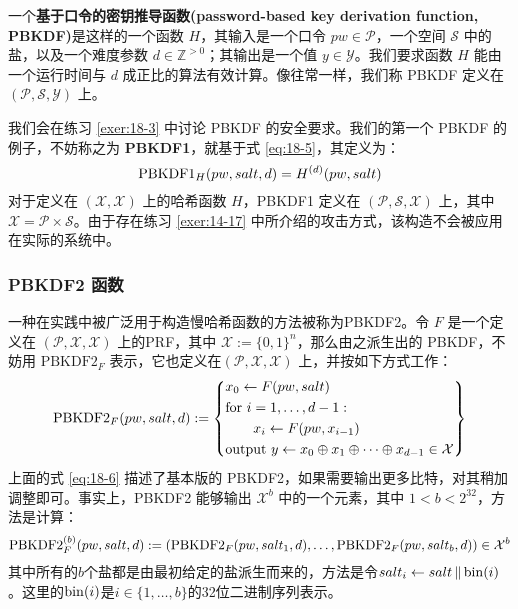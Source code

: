 \begin{definition}
	一个\textbf{基于口令的密钥推导函数(password-based key derivation function, PBKDF)}是这样的一个函数 $H$，其输入是一个口令 $pw\in\mathcal{P}$，一个空间 $\mathcal{S}$ 中的盐，以及一个难度参数 $d\in\mathbb{Z}^{>0}$；其输出是一个值 $y\in\mathcal{Y}$。我们要求函数 $H$ 能由一个运行时间与 $d$ 成正比的算法有效计算。像往常一样，我们称 PBKDF 定义在 $(\mathcal{P},\mathcal{S},\mathcal{Y})$ 上。
\end{definition}

我们会在练习 \ref{exer:18-3} 中讨论 PBKDF 的安全要求。我们的第一个 PBKDF 的例子，不妨称之为 \textbf{PBKDF1}，就基于式 \ref{eq:18-5}，其定义为：
\[
{\rm PBKDF1}_H(pw,salt,d)=H^{(d)}(pw,salt)
\]
对于定义在 $(\mathcal{X},\mathcal{X})$ 上的哈希函数 $H$，PBKDF1 定义在 $(\mathcal{P},\mathcal{S},\mathcal{X})$ 上，其中 $\mathcal{X}=\mathcal{P}\times\mathcal{S}$。由于存在练习 \ref{exer:14-17} 中所介绍的攻击方式，该构造不会被应用在实际的系统中。

\subsubsection{PBKDF2 函数}

一种在实践中被广泛用于构造慢哈希函数的方法被称为PBKDF2。令 $F$ 是一个定义在 $(\mathcal{P},\mathcal{X},\mathcal{X})$ 上的PRF，其中 $\mathcal{X}:=\{0,1\}^n$，那么由之派生出的 PBKDF，不妨用 $\text{PBKDF2}_F$ 表示，它也定义在$(\mathcal{P},\mathcal{X},\mathcal{X})$ 上，并按如下方式工作：
\begin{equation}\label{eq:18-6}
	{\rm PBKDF2}_F(pw,salt,d):=
	\left\{
	\begin{aligned}
		& x_0\leftarrow F(pw, salt)\\
		& \text{for }i=1,\dots,d-1:\\
		& \quad\quad x_i\leftarrow F(pw,x_{i-1})\\
		& \text{output }y\leftarrow x_0 \oplus x_1 \oplus \cdots \oplus x_{d-1}\in\mathcal{X}
	\end{aligned}
	\right\}
\end{equation}
上面的式 \ref{eq:18-6} 描述了基本版的 PBKDF2，如果需要输出更多比特，对其稍加调整即可。事实上，PBKDF2 能够输出 $\mathcal{X}^b$ 中的一个元素，其中 $1<b<2^{32}$，方法是计算：
\begin{equation}\label{eq:18-7}
{\rm PBKDF2}_F^{(b)}(pw,salt,d):=
\left(
{\rm PBKDF2}_F(pw,salt_1,d),\dots,
{\rm PBKDF2}_F(pw,salt_b,d)
\right)
\in\mathcal{X}^b
\end{equation}
其中所有的$b$个盐都是由最初给定的盐派生而来的，方法是令$salt_i\leftarrow salt\,\Vert\,{\rm bin}(i)$。这里的${\rm bin}(i)$是$i\in\{1,\dots,b\}$的32位二进制序列表示。


